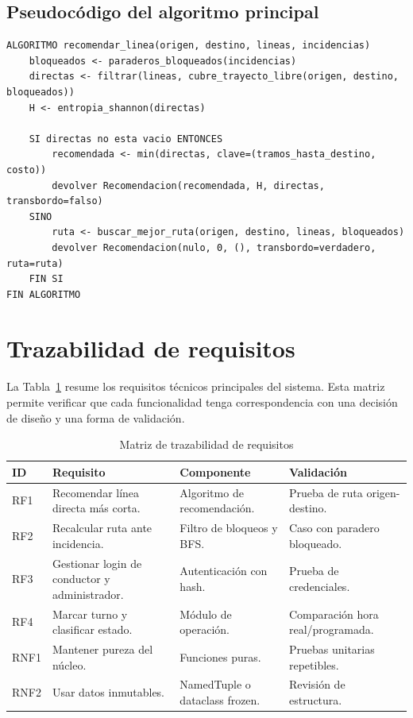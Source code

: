 \documentclass[stu,12pt,floatsintext]{apa7}
\begin{document}
\subsection{Pseudocódigo del algoritmo principal}
\begin{verbatim}
ALGORITMO recomendar_linea(origen, destino, lineas, incidencias)
    bloqueados <- paraderos_bloqueados(incidencias)
    directas <- filtrar(lineas, cubre_trayecto_libre(origen, destino, bloqueados))
    H <- entropia_shannon(directas)

    SI directas no esta vacio ENTONCES
        recomendada <- min(directas, clave=(tramos_hasta_destino, costo))
        devolver Recomendacion(recomendada, H, directas, transbordo=falso)
    SINO
        ruta <- buscar_mejor_ruta(origen, destino, lineas, bloqueados)
        devolver Recomendacion(nulo, 0, (), transbordo=verdadero, ruta=ruta)
    FIN SI
FIN ALGORITMO
\end{verbatim}

\section{Trazabilidad de requisitos}
La Tabla~\ref{tab:requisitos} resume los requisitos técnicos principales del sistema. Esta matriz permite verificar que cada funcionalidad tenga correspondencia con una decisión de diseño y una forma de validación.

\begin{table}[H]
\centering
\caption{Matriz de trazabilidad de requisitos}
\begin{tabular}{p{1.4cm}p{5.2cm}p{3.2cm}p{3.2cm}}
\toprule
\textbf{ID} & \textbf{Requisito} & \textbf{Componente} & \textbf{Validación} \\
\midrule
RF1 & Recomendar línea directa más corta. & Algoritmo de recomendación. & Prueba de ruta origen-destino. \\
RF2 & Recalcular ruta ante incidencia. & Filtro de bloqueos y BFS. & Caso con paradero bloqueado. \\
RF3 & Gestionar login de conductor y administrador. & Autenticación con hash. & Prueba de credenciales. \\
RF4 & Marcar turno y clasificar estado. & Módulo de operación. & Comparación hora real/programada. \\
RNF1 & Mantener pureza del núcleo. & Funciones puras. & Pruebas unitarias repetibles. \\
RNF2 & Usar datos inmutables. & NamedTuple o dataclass frozen. & Revisión de estructura. \\
\bottomrule
\end{tabular}
\label{tab:requisitos}
\end{table}
\end{document}
